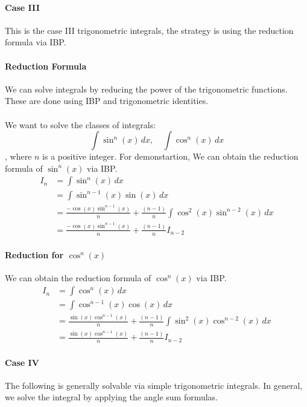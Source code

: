 \documentclass[11pt]{article}
\begin{document}
\paragraph{Case III} This is the case III trigonometric integrals, the strategy is using the reduction formula via IBP.
\paragraph{Reduction Formula} We can solve integrals by reducing the power of the trigonometric functions. These are done using IBP and trigonometric identities.
\paragraph{} We want to solve the classes of integrals:
\begin{equation} 
    \int \sin^n(x) \, dx, \quad \int \cos^n(x) \, dx 
\end{equation}
, where $n$ is a positive integer. For demonstartion, We can obtain the reduction formula of $\sin^n(x)$ via IBP.
\begin{align}
    I_n &= \int \sin^n(x) \, dx \nonumber \\
    &= \int \sin^{n-1}(x) \sin(x) \, dx \nonumber \\
    &= \frac{-\cos(x) \sin^{n-1}(x)}{n} + \frac{(n-1)}{n} \int \cos^2(x) \sin^{n-2}(x) \, dx \nonumber \\
    &= \frac{-\cos(x) \sin^{n-1}(x)}{n} + \frac{(n-1)}{n} I_{n-2}
\end{align}
\paragraph{Reduction for $\cos^n(x)$} We can obtain the reduction formula of $\cos^n(x)$ via IBP.
\begin{align}
    I_n &= \int \cos^n(x) \, dx \nonumber \\
    &= \int \cos^{n-1}(x) \cos(x) \, dx \nonumber \\
    &= \frac{\sin(x) \cos^{n-1}(x)}{n} + \frac{(n-1)}{n} \int \sin^2(x) \cos^{n-2}(x) \, dx \nonumber \\
    &= \frac{\sin(x) \cos^{n-1}(x)}{n} + \frac{(n-1)}{n} I_{n-2}
\end{align} 
\paragraph{Case IV} The following is generally solvable via simple trigonometric integrals. In general, we solve the integral by applying the angle sum formulas.
\end{document}
